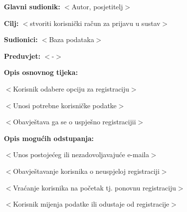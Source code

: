 					\noindent {}
					\begin{packed_item}
	
						\item \textbf{Glavni sudionik: }$<$Autor, posjetitelj$>$
						\item  \textbf{Cilj:} $<$stvoriti korisnički račun za prijavu u sustav$>$
						\item  \textbf{Sudionici:} $<$Baza podataka$>$
						\item  \textbf{Preduvjet:} $<$-$>$
						\item  \textbf{Opis osnovnog tijeka:}
						
						\item[] \begin{packed_enum}
	
							\item $<$Korisnik odabere opciju za registraciju$>$
							\item $<$Unosi potrebne korisničke podatke$>$
							\item $<$Obavještava ga se o uspješno registracijii$>$
						\end{packed_enum}
						
						\item  \textbf{Opis mogućih odstupanja:}
						
						\item[] \begin{packed_item}
	
							\item[2.a] $<$Unos postojećeg ili nezadovoljavajuće e-maila$>$
							\item[] \begin{packed_enum}
								
								\item $<$Obavještavanje korisnika o neuspjeloj registraciji$>$
								\item $<$Vraćanje korisnika na početak tj. ponovnu registraciju$>$
								\item $<$Korisnik mijenja podatke ili odustaje od registracije$>$
								
							\end{packed_enum}
							
						\end{packed_item}
					\end{packed_item}

